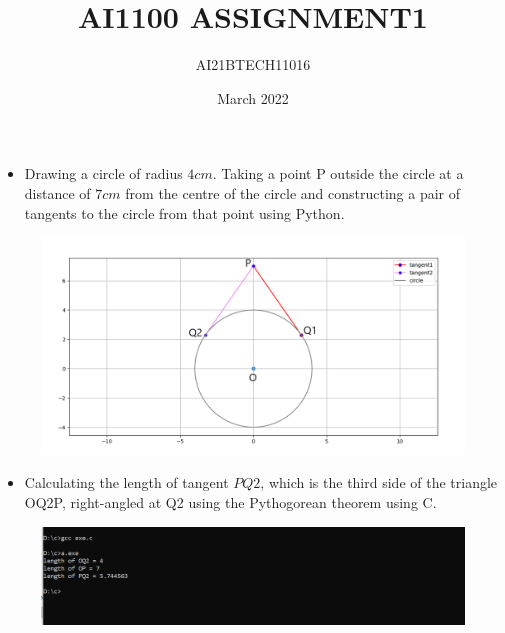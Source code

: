 \documentclass[12pt]{report}
\title{AI1100 ASSIGNMENT1}
\author{AI21BTECH11016}
\date{March 2022}
\begin{document}
\maketitle


\begin{itemize}

\item Drawing a circle of radius $4 cm$. Taking a point P outside the circle at a distance of $7 cm$ from the centre of the circle and constructing a pair of tangents to the circle from that point using Python. \\

\end{itemize}
	    
	
  \begin{figure}[h!]
	  \centering 
	  \includegraphics[width=\columnwidth]{imagePy}
	  \caption{}
	  \end{figure}
	  	  	  
\begin{itemize}

\item Calculating the length of tangent $PQ2$, which is the third side of the triangle OQ2P, right-angled at Q2 using the Pythogorean theorem using C. \\

\end{itemize} 
 
 \begin{figure}[h!]
	  \centering 
	  \includegraphics[width=\columnwidth]{imageC}
	  \caption{}
	  \end{figure}
\end{document}

